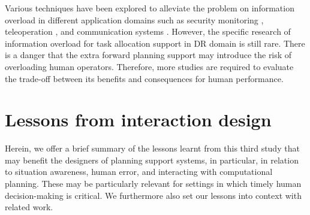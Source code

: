 Various techniques have been explored to alleviate the problem on information overload in different application domains such as security monitoring \citep{Conti2006}, teleoperation \citep{Kadous2006}, and communication systems \citep{Hiltz1985}. However, the specific research of information overload for task allocation support in \ac{DR} domain is still rare. There is a danger that the extra forward planning support may introduce the risk of overloading human operators. Therefore, more studies are required to evaluate the trade-off between its benefits and consequences for human performance.\\










\section{Lessons from interaction design} 
Herein, we offer a brief summary of the lessons learnt from this third study that may benefit the designers of planning support systems, in particular, in relation to situation awareness, human error, and interacting with computational planning. These may be particularly relevant for settings in which timely human decision-making is critical. We furthermore also set our lessons into context with related work.

